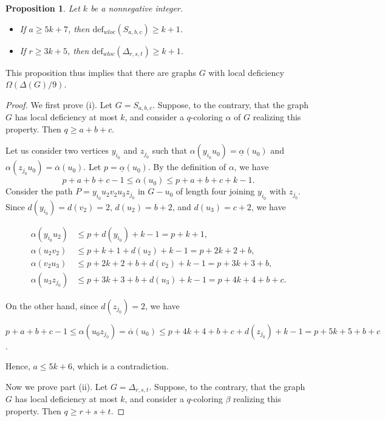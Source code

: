 \documentclass[12pt]{article}
\theoremstyle{plain}
\newtheorem{proposition}[theorem]{Proposition}
\theoremstyle{definition}
\numberwithin{equation}{section}
\begin{document}
\begin{proposition}
\label{prop:rosettes} Let $k$ be a nonnegative integer.
\begin{itemize}
\item[(i)] If $a\geq 5k+7$, then $\mathrm{def}_{wloc}(S_{a,b,c})\geq k+1$.

\item[(ii)] If $r \geq 3k+5$, then $\mathrm{def}_{wloc}(\Delta_{r,s,t})\geq k+1$.
	\end{itemize}

\end{proposition}
This proposition thus implies that there are graphs $G$ with local deficiency  $\Omega(\Delta(G)/9)$.
\begin{proof} 
We first prove (i).
Let $G=S_{a,b,c}$. Suppose, to the contrary, that the graph $G$ has local deficiency at most $k$,
and consider a $q$-coloring $\alpha$ of $G$ realizing this property. Then $q\geq a+b+c$.

Let us consider two vertices $y_{i_0}$ and $z_{j_0}$ %
such that
$\alpha(y_{i_0}u_0)=\underline{\alpha}(u_0)$ and $\alpha(z_{j_0}u_0)=\overline{\alpha}(u_0)$. Let $p=\underline{\alpha}(u_0)$.
By the definition of $\alpha$, we have
$$p+a+b+c-1\leq \overline{\alpha}(u_0) \leq p+a+b+c+k-1.$$
Consider the path $P=y_{i_0} u_2 v_2 u_3 z_{j_0}$ in $G-u_0$
of length four joining $y_{i_0}$ with $z_{j_0}$.
Since $d(y_{i_0})=d(v_2)=2$, $d(u_2)=b+2$, and $d(u_3)=c+2$, we have

\begin{align*}
\alpha(y_{i_0}u_2) &\leq p+d(y_{i_0})+k-1=p+k+1, \\
\alpha(u_2v_2)  & \leq p+k+1+d(u_2)+k-1=p+2k+2+b,  \\
\alpha(v_2u_3)  &\leq p+2k+2+b+d(v_2)+k-1=p+3k+3+b,  \\
\alpha(u_3z_{j_0}) & \leq p+3k+3+b+d(u_3)+k-1=p+4k+4+b+c.  
\end{align*}

On the other hand, since $d(z_{j_0})=2$, we have

\begin{center}
$p+a+b+c-1\leq \alpha(u_0z_{j_0})=\overline{\alpha}(u_0) \leq
p+4k+4+b+c+d(z_{j_0})+k-1=p+5k+5+b+c$.
\end{center}
Hence, $a\leq 5k+6$, which is a contradiction.

\bigskip

Now we prove part (ii).
Let $G=\Delta_{r,s,t}$.
Suppose, to the contrary, that the graph $G$ has local deficiency at most $k$,
and consider a $q$-coloring $\beta$ realizing this property. Then $q\geq r+s+t$.


\end{proof}
\end{document}
